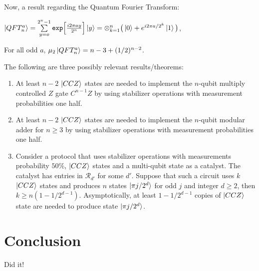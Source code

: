 \documentclass[12pt]{dalthesis}
\begin{document}
\vspace{5mm}

Now, a result regarding the Quantum Fourier Transform:
\begin{center}
$\ket{QFT_n^a} = \sum\limits_{y=o}^{2^n-1} \texttt{exp}\Big[ \frac{i2\pi ay}{2^n} \Big] \ket{y} = \otimes_{k=1}^n \big( \ket{0} + e^{i2\pi a/2^k}\ket{1}\big)$,
\end{center}
For all odd $a$, $\mu_2\ket{QFT_n^a} = n-3 +(1/2)^{n-2}$.

\vspace{5mm}

The following are three possibly relevant results/theorems:

\begin{enumerate}
\item At least $n-2$ $\ket{CCZ}$ states are needed to implement the $n$-qubit multiply controlled $Z$ gate $C^{n-1}Z$ by using stabilizer operations with measurement probabilities one half.

\item At least $n-2$ $\ket{CCZ}$ states are needed to implement the $n$-qubit modular adder for $n \geq 3$ by using stabilizer operations with measurement probabilities one half.


\item Consider a protocol that uses stabilizer operations with measurements probability $50 \% $, $\ket{CCZ}$ states and a multi-qubit state as a catalyst. The catalyst has entries in $\mathcal{R}_{d'}$ for some $d'$. Suppose that such a circuit uses $k$ $\ket{CCZ}$ states and produces $n$ states $\ket{\pi j/2^d}$ for odd $j$ and integer $d \geq 2$, then $k \geq n(1-1/2^{d-1})$. Asymptotically, at least $1 - 1/2^{d-1}$ copies of $\ket{CCZ}$ state are needed to produce state $\ket{\pi j/2^d}$.
\end{enumerate}
\chapter{Conclusion}

Did it!



\end{document}
